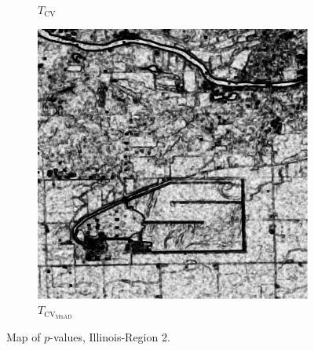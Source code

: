 \documentclass[aspectratio=1610,10pt]{beamer}
\begin{document}
\begin{frame}
\begin{figure}[H]
\begin{subfigure}[b]{0.3\textwidth}
    \caption{$T_\text{CV}$}
    \label{fig:Illinois_crops_pvalue-2}
  \end{subfigure}
  \hfill
  \begin{subfigure}[b]{0.3\textwidth}
    \centering
    \includegraphics[width=\textwidth]{../../Figures/PNG/mnad_p_values_Illinois_crops_1024}
     \caption{$T_{\text{CV}_{\text{MnAD}}}$}
    \label{fig:Illinois_crops_pvalue-3}
  \end{subfigure}
  \caption{Map of $p$-values, Illinois-Region 2. }
  \label{fig:Illinois_crops_pvalue}
\end{figure}
\end{frame} 
\end{document}
